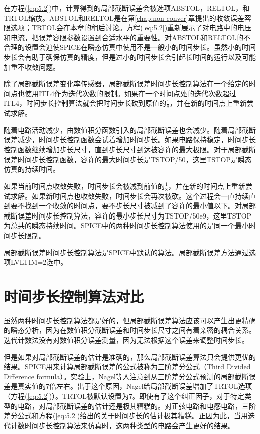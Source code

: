 在方程(\ref{eq:5.2})中，计算得到的局部截断误差会被选项ABSTOL，RELTOL，和TRTOL缩放。ABSTOL和RELTOL是在第\ref{chap:non-conver}章提出的收敛误差容限选项；TRTOL会在本章的稍后讨论。方程(\ref{eq:5.2})重新展示了对电路中的电压和电流，把误差容限参数设置到合适水平的重要性。对ABSTOL和RELTOL的不合理的设置会迫使SPICE在瞬态仿真中使用不是一般小的时间步长。虽然小的时间步长会有助于确保仿真的精度，但是过小的时间步长会引起长时间的运行以及可能加重不收敛问题。

除了局部截断误差变化率传感器，局部截断误差时间步长控制算法在一个给定的时间点也使用ITL4作为迭代次数的限制。如果在一个时间点处的迭代次数超过ITL4，时间步长控制算法就会把时间步长砍到原值的$\frac{1}{8}$，并在新的时间点上重新尝试求解。

随着电路活动减少，由数值积分函数引入的局部截断误差也会减少。随着局部截断误差减少，时间步长控制函数会试着增加时间步长。如果电路保持稳定，时间步长控制函数继续增加步长尺寸，直到步长尺寸到达被容许的最大极限。对于局部截断误差时间步长控制函数，容许的最大时间步长是TSTOP/50，这里TSTOP是瞬态仿真的持续时间。

如果当前时间点收敛失败，时间步长会被减到前值的$\frac{1}{8}$，并在新的时间点上重新尝试求解。如果新时间点也收敛失败，时间步长会再次被砍。这个过程会一直持续直到要不找到一个收敛的时间点，要不步长尺寸被减到了容许的最小值以下。对局部截断误差时间步长控制算法，容许的最小步长尺寸为TSTOP/50e9，这里TSTOP为总共的瞬态持续时间。SPICE中的两种时间步长控制算法使用的是同一个最小时间步长限制。

局部截断误差时间步长控制算法是SPICE中默认的算法。局部截断误差方法通过选项LVLTIM=2选中。

\section{时间步长控制算法对比}
虽然两种时间步长控制算法都是好的，但局部截断误差算法应该可以产生出更精确的瞬态分析，因为在数值积分截断误差和时间步长尺寸之间有着亲密的耦合关系。迭代计数法没有对数值积分误差测量，因为无法根据这个误差来调整时间步长。

但是如果对局部截断误差的估计是准确的，那么局部截断误差算法只会提供更优的结果。SPICE用来计算局部截断误差的公式被称为三阶差分公式（Third Divided Difference formula）\cite{chap5-1}。实验上，Nagel等人注意到从三阶差分公式预测的局部截断误差是真实值的7倍左右。出于这个原因，Nagel给局部截断误差增加了TRTOL选项（方程(\ref{eq:5.2})）。TRTOL被默认设置为7。即使有了这个纠正因子，对于特定类型的电路，对局部截断误差的估计还是极其糟糕的。对正弦电路和电感电路，三阶差分公式和方程(\ref{eq:5.2})给出的关于时间步长的估计极其糟糕。正因为此，当用迭代计数时间步长控制算法来仿真时，这两种类型的电路会产生更好的结果。

